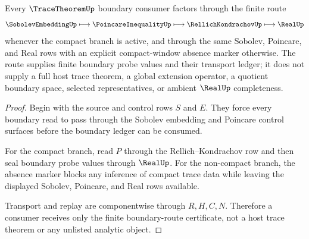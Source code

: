 \begin{theorem}
\label{thm:trace-theorem-boundary-route}
Every $\TraceTheoremUp$ boundary consumer factors through the finite route
$$
\SobolevEmbeddingUp \longmapsto \PoincareInequalityUp \longmapsto \RellichKondrachovUp \longmapsto \RealUp
$$
whenever the compact branch is active, and through the same Sobolev, Poincare, and Real rows with an explicit compact-window absence marker otherwise. The route supplies finite boundary probe values and their transport ledger; it does not supply a full host trace theorem, a global extension operator, a quotient boundary space, selected representatives, or ambient $\RealUp$ completeness.
\end{theorem}
\begin{proof}
Begin with the source and control rows $S$ and $E$. They force every boundary read to pass through the Sobolev embedding and Poincare control surfaces before the boundary ledger can be consumed.

For the compact branch, read $P$ through the Rellich--Kondrachov row and then seal boundary probe values through $\RealUp$. For the non-compact branch, the absence marker blocks any inference of compact trace data while leaving the displayed Sobolev, Poincare, and Real rows available.

Transport and replay are componentwise through $R,H,C,N$. Therefore a consumer receives only the finite boundary-route certificate, not a host trace theorem or any unlisted analytic object.
\end{proof}

\begin{closurestatus}{\TraceTheoremUp}
  \theoryclosure{\seedClosure}
  \formalstatus{\unformalizedV}
\end{closurestatus}
